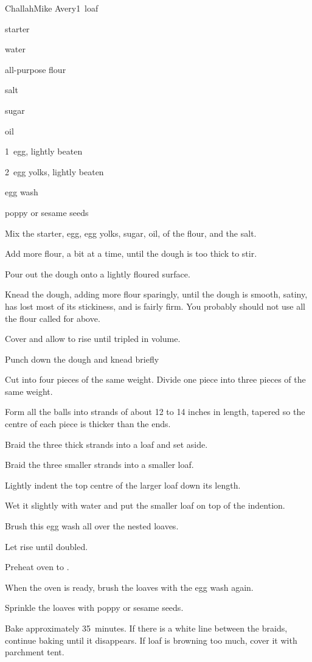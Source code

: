 \begin{recipe}{Challah}{Mike Avery\FIXME}{1~loaf}

\begin{ingredients}
\item {} starter
\item \C{\half} water
\item \C{3\twothird} all-purpose flour
\item {} salt
\item \C{\quarter} sugar
\item \C{\quarter} oil
\item 1~egg, lightly beaten
\item 2~egg yolks, lightly beaten
\item egg wash
\item poppy or sesame seeds
\end{ingredients}

\begin{directions}
\item Mix the starter, egg, egg yolks, sugar, oil, \half{} of the flour, and the salt. 
\item Add more flour, a bit at a time, until the dough is too thick to stir.
\item Pour out the dough onto a lightly floured surface.
\item Knead the dough, adding more flour sparingly, until the dough is smooth, satiny, has lost most of its stickiness, and is fairly firm. You probably should not use all the flour called for above.
\item Cover and allow to rise until tripled in volume.
\item Punch down the dough and knead briefly
\item Cut into four pieces of the same weight. Divide one piece into three pieces of the same weight.
\item Form all the balls into strands of about 12 to 14 inches in length, tapered so the centre of each piece is thicker than the ends.
\item Braid the three thick strands into a loaf and set aside.
\item Braid the three smaller strands into a smaller loaf.
\item Lightly indent the top centre of the larger loaf down its length.
\item Wet it slightly with water and put the smaller loaf on top of the indention.
\item Brush this egg wash all over the nested loaves.
\item Let rise until doubled.
\item Preheat oven to .
\item When the oven is ready, brush the loaves with the egg wash again.
\item Sprinkle the loaves with poppy or sesame seeds.
\item Bake approximately 35~minutes. If there is a white line between the braids, continue baking until it disappears. If loaf is browning too much, cover it with parchment tent.
\end{directions}

\end{recipe}
